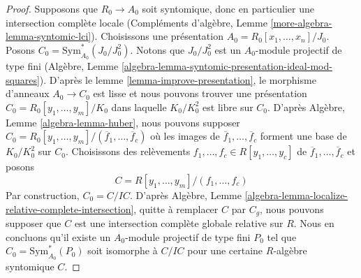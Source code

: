 \begin{proof}
Supposons que $R_0 \to A_0$ soit syntomique, donc en particulier une
intersection complète locale (Compléments d'algèbre, Lemme
\ref{more-algebra-lemma-syntomic-lci}).
Choisissons une présentation $A_0 = R_0[x_1, \ldots, x_n]/J_0$. Posons
$C_0 = \text{Sym}^*_{A_0}(J_0/J_0^2)$. Notons que $J_0/J_0^2$ est un
$A_0$-module projectif de type fini (Algèbre, Lemme
\ref{algebra-lemma-syntomic-presentation-ideal-mod-squares}).
D'après le lemme \ref{lemma-improve-presentation}, le morphisme d'anneaux
$A_0 \to C_0$ est lisse et nous pouvons trouver une présentation
$C_0 = R_0[y_1, \ldots, y_m]/K_0$ dans laquelle $K_0/K_0^2$ est libre sur
$C_0$. D'après Algèbre, Lemme \ref{algebra-lemma-huber}, nous pouvons supposer
$C_0 = R_0[y_1, \ldots, y_m]/(\overline{f}_1, \ldots, \overline{f}_c)$
où les images de $\overline{f}_1, \ldots, \overline{f}_c$ forment une base de
$K_0/K_0^2$ sur $C_0$. Choisissons des relèvements
$f_1, \ldots, f_c \in R[y_1, \ldots, y_c]$ de
$\overline{f}_1, \ldots, \overline{f}_c$ et posons
$$
C = R[y_1, \ldots, y_m]/(f_1, \ldots, f_c)
$$
Par construction, $C_0 = C/IC$. D'après Algèbre, Lemme
\ref{algebra-lemma-localize-relative-complete-intersection},
quitte à remplacer $C$ par $C_g$, nous pouvons supposer que $C$ est une
intersection complète globale relative sur $R$.
Nous en concluons qu'il existe un $A_0$-module projectif de type fini $P_0$ tel
que $C_0 = \text{Sym}^*_{A_0}(P_0)$ soit isomorphe à $C/IC$ pour une certaine
$R$-algèbre syntomique $C$.


\end{proof}
